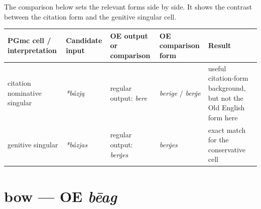 \documentclass[
  british,
  a4paper,
  openany]{book}
\newcounter{none} %
\providecommand{\texorpdfstring}[2]{#1}
\begin{document}
The comparison below sets the relevant forms side by side. It shows the
contrast between the citation form and the genitive singular cell.

{\def\LTcaptype{none} %
\begin{longtable}[]{@{}
  >{\raggedright\arraybackslash}p{}
  >{\raggedright\arraybackslash}p{}
  >{\raggedright\arraybackslash}p{}
  >{\raggedright\arraybackslash}p{}
  >{\raggedright\arraybackslash}p{}@{}}
\toprule\noalign{}
\begin{minipage}[b]{\linewidth}\raggedright
PGmc cell / interpretation
\end{minipage} & \begin{minipage}[b]{\linewidth}\raggedright
Candidate input
\end{minipage} & \begin{minipage}[b]{\linewidth}\raggedright
OE output or comparison
\end{minipage} & \begin{minipage}[b]{\linewidth}\raggedright
OE comparison form
\end{minipage} & \begin{minipage}[b]{\linewidth}\raggedright
Result
\end{minipage} \\
\midrule\noalign{}
\endhead
\bottomrule\noalign{}
\endlastfoot
citation nominative singular & {\emph{*bázją}} & regular output:
{\emph{bere}} & {\emph{berige}} / {\emph{berġe}} & useful citation-form
background, but not the Old English form here \\
genitive singular & {\emph{*bázjas}} & regular output: \emph{berġes} &
{\emph{berġes}} & exact match for the conservative cell \\
\end{longtable}
}

\section{\texorpdfstring{bow --- OE
\emph{bēag}}{bow --- OE bēag}}\label{bow-oe-bux113ag}

\end{document}
